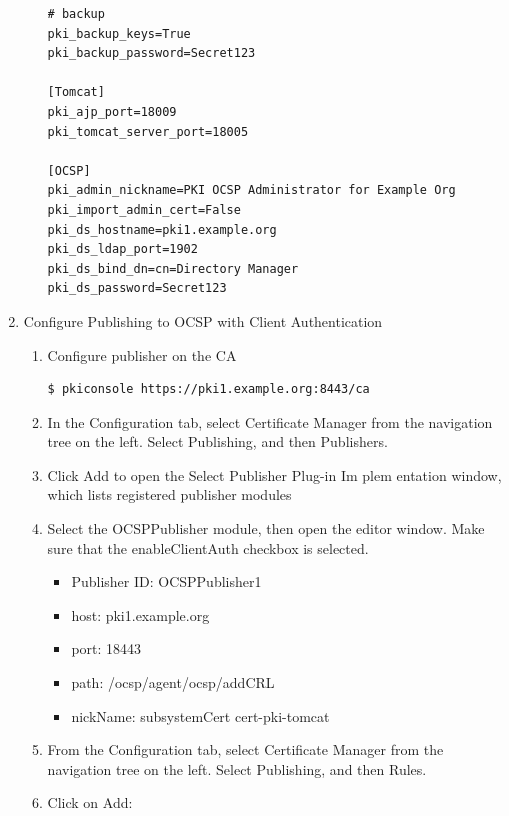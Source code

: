 \documentclass[a4paper]{article}
\begin{document}
\begin{enumerate}[label*=\arabic*.]
\begin{enumerate}[label*=\arabic*.]
\begin{lstlisting}[style=configFile]
# backup
pki_backup_keys=True
pki_backup_password=Secret123

[Tomcat]
pki_ajp_port=18009
pki_tomcat_server_port=18005

[OCSP]
pki_admin_nickname=PKI OCSP Administrator for Example Org
pki_import_admin_cert=False
pki_ds_hostname=pki1.example.org
pki_ds_ldap_port=1902
pki_ds_bind_dn=cn=Directory Manager
pki_ds_password=Secret123
                    \end{lstlisting}
            \end{enumerate}
        \item Configure Publishing to OCSP with Client Authentication
             \begin{enumerate}[label*=\arabic*.]
                \item Configure publisher on the CA
                    \begin{lstlisting}[style=bashInputStyle]
$ pkiconsole https://pki1.example.org:8443/ca                    
                    \end{lstlisting}
                \item In the Configuration tab, select Certificate Manager from the navigation tree on
                    the left. Select Publishing, and then Publishers.
                \item Click Add to open the Select Publisher Plug-in Im plem entation window, which
                    lists registered publisher modules
                \item Select the OCSPPublisher module, then open the editor window. Make sure that the
                    enableClientAuth checkbox is selected.
                    \begin{itemize}
                        \item Publisher ID: OCSPPublisher1
                        \item host: pki1.example.org
                        \item port: 18443
                        \item path: /ocsp/agent/ocsp/addCRL
                        \item nickName: subsystemCert cert-pki-tomcat
                    \end{itemize}
                \item From the Configuration tab, select Certificate Manager from the navigation tree on the left. 
                    Select  Publishing, and then Rules.
                \item Click on Add:

\end{enumerate}
\end{enumerate}
\end{document}
